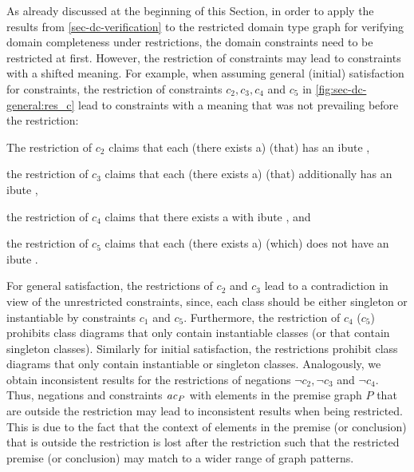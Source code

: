 As already discussed at the beginning of this Section, in order to apply the results from \cref{sec-dc-verification} to the restricted domain type graph for verifying domain completeness under restrictions, the domain constraints need to be restricted at first.
However, the restriction of constraints may lead to constraints with a shifted meaning.
For example, when assuming general (initial) satisfaction for constraints, the restriction of constraints $c_2,c_3,c_4$ and $c_5$ in \cref{fig:sec-dc-general:res_c} lead to constraints with a meaning that was not prevailing before the restriction:
\begin{enumerate*}
\item The restriction of $c_2$ claims that each (there exists a)  (that) has an ibute ,
\item the restriction of $c_3$ claims that each (there exists a)  (that) additionally has an ibute ,
\item the restriction of $c_4$ claims that there exists a  with ibute , and
\item the restriction of $c_5$ claims that each (there exists a)  (which) does not have an ibute .
\end{enumerate*}
For general satisfaction, the restrictions of $c_2$ and $c_3$ lead to a contradiction in view of the unrestricted constraints, since, each class should be either singleton or instantiable by constraints $c_1$ and $c_5$.
Furthermore, the restriction of $c_4$ ($c_5$) prohibits class diagrams that only contain instantiable classes (or that contain singleton classes).
Similarly for initial satisfaction, the restrictions prohibit class diagrams that only contain instantiable or singleton classes.
Analogously, we obtain inconsistent results for the restrictions of negations $\neg c_2,\neg c_3$ and $\neg c_4$.
Thus, negations and constraints $\mathit{ac}_P$ with elements in the premise graph $P$ that are outside the restriction may lead to inconsistent results when being restricted.
This is due to the fact that the context of elements in the premise (or conclusion) that is outside the restriction is lost after the restriction such that the restricted premise (or conclusion) may match to a wider range of graph patterns.

